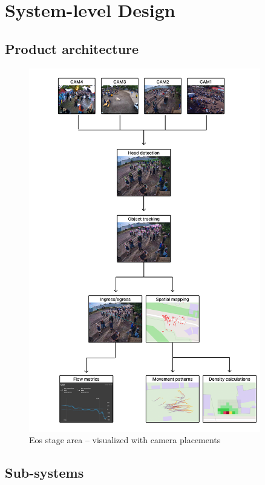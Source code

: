 \chapter{System-level Design}
\label{chap:system-level-design}

\section{Product architecture}

\begin{figure}
  \centering
  \includegraphics[width=0.9\textwidth]{Pictures/Figures/system_flowchart.png}
  \caption{Eos stage area -- visualized with camera placements}
\end{figure}


\section{Sub-systems}

